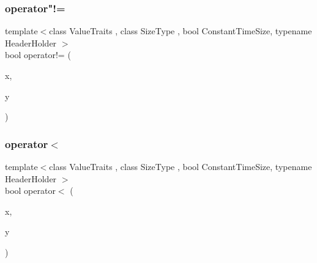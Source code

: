 \subsubsection{\texorpdfstring{operator"!=}{operator!=}}
{\footnotesize\ttfamily template$<$class Value\+Traits , class Size\+Type , bool Constant\+Time\+Size, typename Header\+Holder $>$ \\
bool operator!= (\begin{DoxyParamCaption}\item[{const \hyperlink{classboost_1_1intrusive_1_1list__impl}{list\+\_\+impl}$<$ Value\+Traits, Size\+Type, Constant\+Time\+Size, Header\+Holder $>$ \&}]{x,  }\item[{const \hyperlink{classboost_1_1intrusive_1_1list__impl}{list\+\_\+impl}$<$ Value\+Traits, Size\+Type, Constant\+Time\+Size, Header\+Holder $>$ \&}]{y }\end{DoxyParamCaption})\hspace{0.3cm}{\ttfamily [friend]}}

\mbox{\label{classboost_1_1intrusive_1_1list__impl_aca2da5db0e59cc4aa259b748d571516a}} 
\subsubsection{\texorpdfstring{operator$<$}{operator<}}
{\footnotesize\ttfamily template$<$class Value\+Traits , class Size\+Type , bool Constant\+Time\+Size, typename Header\+Holder $>$ \\
bool operator$<$ (\begin{DoxyParamCaption}\item[{const \hyperlink{classboost_1_1intrusive_1_1list__impl}{list\+\_\+impl}$<$ Value\+Traits, Size\+Type, Constant\+Time\+Size, Header\+Holder $>$ \&}]{x,  }\item[{const \hyperlink{classboost_1_1intrusive_1_1list__impl}{list\+\_\+impl}$<$ Value\+Traits, Size\+Type, Constant\+Time\+Size, Header\+Holder $>$ \&}]{y }\end{DoxyParamCaption})\hspace{0.3cm}{\ttfamily [friend]}}

\mbox{\label{classboost_1_1intrusive_1_1list__impl_a7efc3d66080937cc7b391259f3a755df}} 
